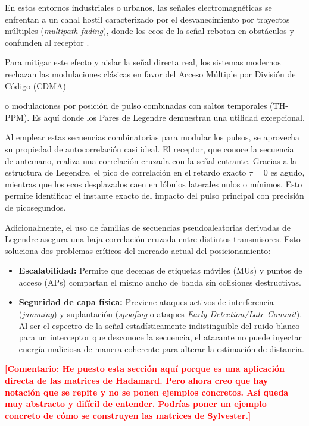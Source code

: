 \documentclass[12pt,a4paper]{tfg_domingo}
\newcommand{\Comentario}[1]{\textcolor{red}{\textbf{[Comentario:
      #1]}}}
\begin{document}
En estos entornos industriales o urbanos, las señales electromagnéticas se enfrentan a un canal hostil caracterizado por el desvanecimiento por trayectos múltiples (\emph{multipath fading}), donde los ecos de la señal rebotan en obstáculos y confunden al receptor \cite{cantabria2021positioning}.

Para mitigar este efecto y aislar la señal directa real, los sistemas
modernos rechazan las modulaciones clásicas en favor del Acceso
Múltiple por División de Código (CDMA)


o modulaciones por posición de pulso combinadas con saltos temporales (TH-PPM). Es aquí donde los Pares de Legendre demuestran una utilidad excepcional. 

Al emplear estas secuencias combinatorias para modular los pulsos, se aprovecha su propiedad de autocorrelación casi ideal. El receptor, que conoce la secuencia de antemano, realiza una correlación cruzada con la señal entrante. Gracias a la estructura de Legendre, el pico de correlación en el retardo exacto $\tau = 0$ es agudo, mientras que los ecos desplazados caen en lóbulos laterales nulos o mínimos. Esto permite identificar el instante exacto del impacto del pulso principal con precisión de picosegundos.

Adicionalmente, el uso de familias de secuencias pseudoaleatorias derivadas de Legendre asegura una baja correlación cruzada entre distintos transmisores. Esto soluciona dos problemas críticos del mercado actual del posicionamiento: 
\begin{itemize}
    \item \textbf{Escalabilidad:} Permite que decenas de etiquetas móviles (MUs) y puntos de acceso (APs) compartan el mismo ancho de banda sin colisiones destructivas.
    \item \textbf{Seguridad de capa física:} Previene ataques activos de interferencia (\emph{jamming}) y suplantación (\emph{spoofing} o ataques \emph{Early-Detection/Late-Commit}). Al ser el espectro de la señal estadísticamente indistinguible del ruido blanco para un interceptor que desconoce la secuencia, el atacante no puede inyectar energía maliciosa de manera coherente para alterar la estimación de distancia.
    \end{itemize}

    \Comentario{He puesto esta sección aquí porque es una aplicación
      directa de las matrices de Hadamard. Pero ahora creo que hay
      notación que se repite y no se ponen ejemplos concretos. Así
      queda muy abstracto y difícil de entender. Podrías poner un
      ejemplo concreto de cómo se construyen las matrices de Sylvester.}
\end{document}
